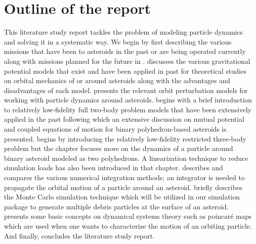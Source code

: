 \section{Outline of the report}
This literature study report tackles the problem of modeling particle dynamics and solving it in a systematic way. We begin by first describing the various missions that have been to asteroids in the past or are being operated currently along with missions planned for the future in .  discusses the various gravitational potential models that exist and have been applied in past for theoretical studies on orbital mechanics of or around asteroids along with the advantages and disadvantages of each model.  presents the relevant orbit perturbation models for working with particle dynamics around asteroids.  begins with a brief introduction to relatively low-fidelity full two-body problem models that have been extensively applied in the past following which an extensive discussion on mutual potential and coupled equations of motion for binary polyhedron-based asteroids is presented.  begins by introducing the relatively low-fidelity restricted three-body problem but the chapter focuses more on the dynamics of a particle around binary asteroid modeled as two polyhedrons. A linearization technique to reduce simulation loads has also been introduced in that chapter.  describes and compares the various numerical integration methods; an integrator is needed to propagate the orbital motion of a particle around an asteroid.  briefly describes the Monte Carlo simulation technique which will be utilized in our simulation package to generate multiple debris particles at the surface of an asteroid.  presents some basic concepts on dynamical systems theory such as poincar\'e maps which are used when one wants to characterize the motion of an orbiting particle. And finally,  concludes the literature study report.
